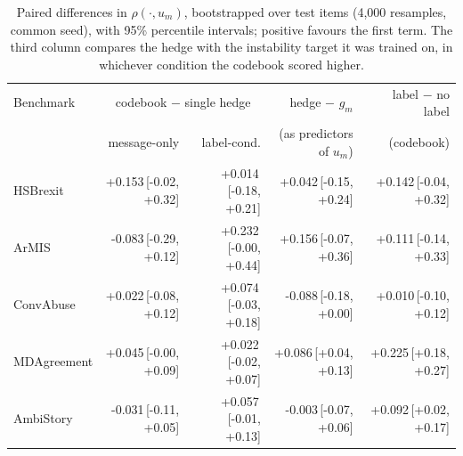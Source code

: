 \begin{table}[t]
\centering
\small
\begin{tabular}{lrrrr}
\hline
Benchmark & \multicolumn{2}{c}{codebook $-$ single hedge} & hedge $-$ $g_m$ & label $-$ no label \\
 & message-only & label-cond. & (as predictors of $u_m$) & (codebook) \\
\hline
HSBrexit & +0.153{\scriptsize\,[-0.02, +0.32]} & +0.014{\scriptsize\,[-0.18, +0.21]} & +0.042{\scriptsize\,[-0.15, +0.24]} & +0.142{\scriptsize\,[-0.04, +0.32]} \\
ArMIS & -0.083{\scriptsize\,[-0.29, +0.12]} & +0.232{\scriptsize\,[-0.00, +0.44]} & +0.156{\scriptsize\,[-0.07, +0.36]} & +0.111{\scriptsize\,[-0.14, +0.33]} \\
ConvAbuse & +0.022{\scriptsize\,[-0.08, +0.12]} & +0.074{\scriptsize\,[-0.03, +0.18]} & -0.088{\scriptsize\,[-0.18, +0.00]} & +0.010{\scriptsize\,[-0.10, +0.12]} \\
MDAgreement & +0.045{\scriptsize\,[-0.00, +0.09]} & +0.022{\scriptsize\,[-0.02, +0.07]} & +0.086{\scriptsize\,[+0.04, +0.13]} & +0.225{\scriptsize\,[+0.18, +0.27]} \\
AmbiStory & -0.031{\scriptsize\,[-0.11, +0.05]} & +0.057{\scriptsize\,[-0.01, +0.13]} & -0.003{\scriptsize\,[-0.07, +0.06]} & +0.092{\scriptsize\,[+0.02, +0.17]} \\
\hline
\end{tabular}
\caption{Paired differences in $\rho(\cdot,u_m)$, bootstrapped over test items (4,000 resamples, common seed), with 95\% percentile intervals; positive favours the first term. The third column compares the hedge with the instability target it was trained on, in whichever condition the codebook scored higher.}
\label{tab:paired}
\end{table}